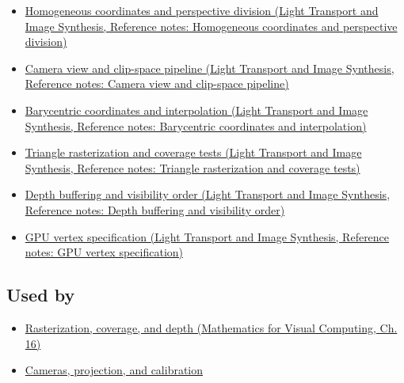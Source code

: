 \begin{itemize}
\tightlist
\item
  \href{../04-Light-Transport-and-Image-Synthesis/main.pdf\#nameddest=appendix-cb3b26862282}{Homogeneous coordinates and perspective division (Light Transport and Image Synthesis, Reference notes: Homogeneous coordinates and perspective division)}
\item
  \href{../04-Light-Transport-and-Image-Synthesis/main.pdf\#nameddest=appendix-1c07d64f5e70}{Camera view and clip-space pipeline (Light Transport and Image Synthesis, Reference notes: Camera view and clip-space pipeline)}
\item
  \href{../04-Light-Transport-and-Image-Synthesis/main.pdf\#nameddest=appendix-02b9d9a81dca}{Barycentric coordinates and interpolation (Light Transport and Image Synthesis, Reference notes: Barycentric coordinates and interpolation)}
\item
  \href{../04-Light-Transport-and-Image-Synthesis/main.pdf\#nameddest=appendix-ed3f9bc298fe}{Triangle rasterization and coverage tests (Light Transport and Image Synthesis, Reference notes: Triangle rasterization and coverage tests)}
\item
  \href{../04-Light-Transport-and-Image-Synthesis/main.pdf\#nameddest=appendix-97578ed97952}{Depth buffering and visibility order (Light Transport and Image Synthesis, Reference notes: Depth buffering and visibility order)}
\item
  \href{../04-Light-Transport-and-Image-Synthesis/main.pdf\#nameddest=appendix-749ba51a6c25}{GPU vertex specification (Light Transport and Image Synthesis, Reference notes: GPU vertex specification)}
\end{itemize}

\subsection{Used by}\label{appendix-40426e4b2103-used-by}

\begin{itemize}
\tightlist
\item
  \href{../02-Mathematics-for-Visual-Computing/main.pdf\#nameddest=03-visual-computing-i-ch012-rasterization-coverage-and-depth}{Rasterization, coverage, and depth (Mathematics for Visual Computing, Ch. 16)}
\item
  \hyperref[03-visual-computing-i-ch003-cameras-projection-and-calibration]{Cameras, projection, and calibration}
\end{itemize}

